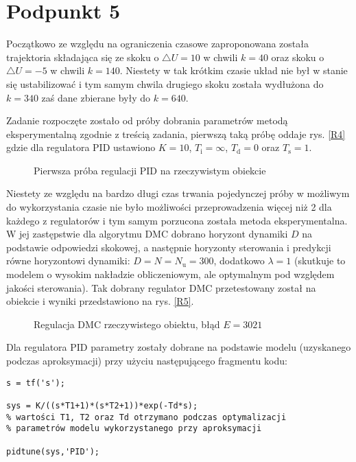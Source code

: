 \chapter{Podpunkt 5}
Początkowo ze względu na ograniczenia czasowe zaproponowana została trajektoria składająca się ze skoku o $\triangle U=10$ w chwili $k=40$ oraz skoku o $\triangle U=-5$ w chwili $k=140$. Niestety w tak krótkim czasie układ nie był w stanie się ustabilizować i tym samym chwila drugiego skoku została wydłużona do $k=340$ zaś dane zbierane były do $k=640$.

Zadanie rozpoczęte zostało od próby dobrania parametrów metodą eksperymentalną zgodnie z treścią zadania, pierwszą taką próbę oddaje rys. \ref{R4} gdzie dla regulatora PID ustawiono $K=10$, $T_{\mathrm{i}}=\infty$, $T_{\mathrm{d}}=0$ oraz $T_{\mathrm{s}}=1$.

\begin{figure}[ht]
\centering
%
\caption{Pierwsza próba regulacji PID na rzeczywistym obiekcie}
\label{R7}
\end{figure}
Niestety ze względu na bardzo długi czas trwania pojedynczej próby w możliwym do wykorzystania czasie nie było możliwości przeprowadzenia więcej niż 2 dla każdego z regulatorów i tym samym porzucona została metoda eksperymentalna. W jej zastępstwie dla algorytmu DMC dobrano horyzont dynamiki $D$ na podstawie odpowiedzi skokowej, a następnie horyzonty sterowania i predykcji równe horyzontowi dynamiki: $D=N=N_{\mathrm{u}}=300$, dodatkowo $\lambda=1$ (skutkuje to modelem o wysokim nakładzie obliczeniowym, ale optymalnym pod względem jakości sterowania). Tak dobrany regulator DMC przetestowany został na obiekcie i wyniki przedstawiono na rys. \ref{R5}.

\begin{figure}[ht]
\centering
%
\caption{Regulacja DMC rzeczywistego obiektu, błąd $E = 3021$}
\label{R8}
\end{figure}
Dla regulatora PID parametry zostały dobrane na podstawie modelu (uzyskanego podczas aproksymacji) przy użyciu następującego fragmentu kodu:

\begin{lstlisting}[style=Matlab-editor]
s = tf('s');

sys = K/((s*T1+1)*(s*T2+1))*exp(-Td*s);
% wartości T1, T2 oraz Td otrzymano podczas optymalizacji
% parametrów modelu wykorzystanego przy aproksymacji

pidtune(sys,'PID');
\end{lstlisting} 

